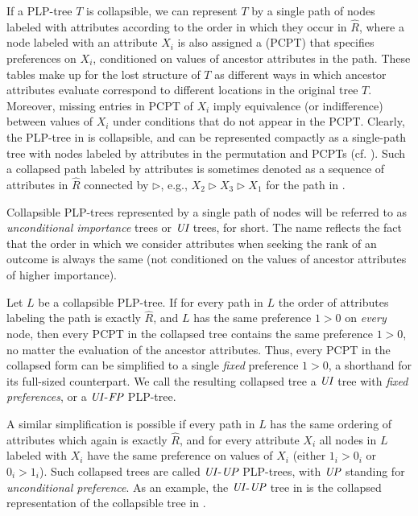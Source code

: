 If a PLP-tree $T$ is collapsible, we can represent $T$ by a single path
of nodes labeled with attributes according to the order in which they occur
in $\hat{R}$, 
where a node labeled with an attribute $X_i$ is also assigned a
 (PCPT) that specifies 
preferences on $X_i$, conditioned on values of ancestor attributes in the path.
These tables make up for the lost structure of $T$ as different ways in 
which ancestor attributes evaluate correspond to different locations 
in the original tree $T$. 
Moreover, missing entries in PCPT of $X_i$ imply equivalence (or indifference) between values of $X_i$
under conditions that do not appear in the PCPT.
Clearly, the PLP-tree in  is collapsible, and can
be represented compactly as a single-path tree with nodes labeled by 
attributes in the permutation and PCPTs (cf. ).
Such a collapsed path labeled by attributes is sometimes denoted as
a sequence of attributes in $\hat{R}$ connected by $\triangleright$, e.g.,
$X_2\triangleright X_3\triangleright X_1$ for the path in .

Collapsible PLP-trees represented by a single path of nodes 
will be referred to as \emph{unconditional importance} trees or $\textit{UI}$ 
trees, for short. The name reflects the fact that the order in which 
we consider attributes when seeking the rank of an outcome is always the 
same (not conditioned on the values of ancestor attributes of higher importance).

Let $L$ be a collapsible PLP-tree.
If for every path in $L$ the order of attributes labeling the path is exactly $\hat{R}$,
and $L$ has the same preference $1>0$ on \emph{every} node,
then every PCPT in the collapsed tree contains the same preference $1>0$,
no matter the evaluation of the ancestor attributes.
Thus, every PCPT in the collapsed form can be simplified to a single \emph{fixed} preference $1>0$,
a shorthand for its full-sized counterpart.
We call the resulting
collapsed tree a $\textit{UI}$ tree with \emph{fixed preferences}, or a $\textit{UI}$-$\textit{FP}$ PLP-tree.

A similar simplification is possible if every path in $L$ has the same ordering of attributes
which again is exactly $\hat{R}$, and
for every attribute $X_i$ all nodes in $L$ labeled with $X_i$ have the same
preference on values of $X_i$ (either $1_i>0_i$ or $0_i>1_i$).
Such collapsed 
trees are called $\textit{UI}$-$\textit{UP}$ PLP-trees, with $\textit{UP}$ standing for \emph{unconditional 
preference}. As an example, the $\textit{UI}$-$\textit{UP}$ tree in 
is the collapsed representation of the collapsible tree in .

